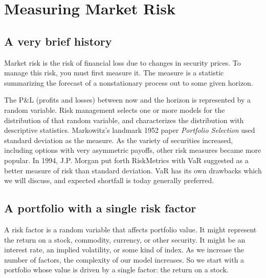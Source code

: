 \documentclass{report}
\numberwithin{problem}{chapter} %
\newcommand{\pnl}{P\&L }
\begin{document}
\chapter{Measuring Market Risk}

\section{A very brief history}
Market risk is the risk of financial loss due to changes in security prices. To manage this risk, you must first measure it. The measure is a statistic summarizing the forecast of a \gls{nonstationary} process out to some given horizon. 

The \pnl (profits and losses) between now and the horizon is represented by a random variable. Risk management selects one or more models for the distribution of that random variable, and characterizes the distribution with descriptive statistics. Markowitz's landmark 1952 paper {\it Portfolio Selection} used standard deviation as the measure. As the variety of securities increased, including options with very asymmetric payoffs, other risk measures became more popular. In 1994, J.P. Morgan put forth RiskMetrics with VaR suggested as a better measure of risk than standard deviation. VaR has its own drawbacks which we will discuss, and expected shortfall is today generally preferred.  

\section{A portfolio with a single risk factor}
A risk factor is a random variable that affects portfolio value. It might represent the return on a stock, commodity, currency, or other security. It might be an interest rate, an implied volatility, or some kind of index. As we increase the number of factors, the complexity of our model increases. So we start with a portfolio whose value is driven by a single factor: the return on a stock.
\end{document}
